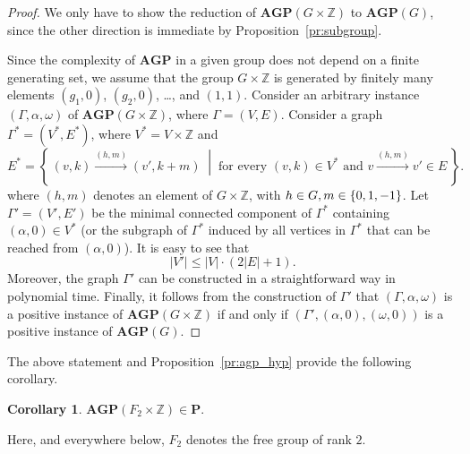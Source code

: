 \documentclass[10pt]{amsart}
\newcommand{\Set}[2]{\left\{\, #1 \;\middle|\; #2 \,\right\}}%
\theoremstyle{definition}
\newtheorem{corollary}[theorem]{Corollary}
\def\P{{\mathbf{P}}}
\def\AGP{{\mathbf{AGP}}}
\begin{document}
\begin{proof}
We only have to show the reduction of $\AGP(G\times\mathbb Z)$ to $\AGP(G)$, since the other direction is immediate by Proposition~\ref{pr:subgroup}.

Since the complexity of $\AGP$ in a given group does not depend on a finite generating set, we assume that the group $G\times\mathbb Z$ is generated by finitely many elements $(g_1,0)$, $(g_2,0)$, \ldots, and $(1,1)$. Consider an arbitrary instance $(\Gamma,\alpha,\omega)$ of $\AGP(G\times \mathbb Z)$, where $\Gamma = (V,E)$.
Consider a graph $\Gamma^\ast = (V^\ast,E^\ast)$, where $V^\ast = V\times \mathbb Z$ and
$$
E^\ast = \Set{(v,k) \stackrel{(h,m)}{\to} (v',k+m)}{\mbox{for every }(v,k) \in V^\ast \mbox{ and } v \stackrel{(h,m)}{\to} v' \in E}.
$$
where $(h,m)$ denotes an element of $G\times\mathbb Z$, with $h\in G,m\in \mathbb \{0,1,-1\}$.
Let $\Gamma'= (V', E')$ be the minimal connected component of $\Gamma^\ast$ containing $(\alpha,0) \in V^\ast$
(or the subgraph of $\Gamma^\ast$ induced by all vertices in $\Gamma^\ast$ that can be reached from $(\alpha,0)$).
It is easy to see that
$$|V'| \le |V| \cdot (2|E|+1).$$
Moreover, the graph $\Gamma'$ can be constructed in a straightforward way in polynomial time.
Finally, it follows from the construction of $\Gamma'$ that $(\Gamma,\alpha,\omega)$ is a positive instance
of $\AGP(G\times \mathbb Z)$ if and only if
$(\Gamma',(\alpha,0),(\omega,0))$ is a positive instance of $\AGP(G)$.
\end{proof}

The above statement and Proposition~\ref{pr:agp_hyp} provide the following corollary.
\begin{corollary}\label{co:F2xZ}
$\AGP(F_2\times \mathbb Z) \in \P$.
\end{corollary}
Here, and everywhere below, $F_2$ denotes the free group of rank $2$.
\end{document}
